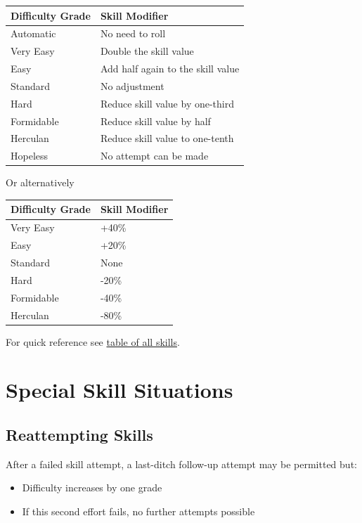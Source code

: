 \documentclass[10pt]{article}
\begin{document}
\begin{longtable}{|l|l|}
\hline
\textbf{Difficulty Grade} & \textbf{Skill Modifier} \\
\hline
Automatic & No need to roll \\
Very Easy & Double the skill value \\
Easy & Add half again to the skill value \\
Standard & No adjustment \\
Hard & Reduce skill value by one-third \\
Formidable & Reduce skill value by half \\
Herculan & Reduce skill value to one-tenth \\
Hopeless & No attempt can be made \\
\hline
\end{longtable}

Or alternatively 

\begin{longtable}{|l|l|}
\hline
\textbf{Difficulty Grade} & \textbf{Skill Modifier} \\
\hline
Very Easy & +40\% \\
Easy & +20\% \\
Standard & None \\
Hard & -20\% \\
Formidable & -40\% \\
Herculan & -80\% \\
\hline
\end{longtable}

For quick reference see \hyperref[sec:skill_table]{table of all skills}.

\section{Special Skill Situations}

\subsection{Reattempting Skills}
\label{sec:reattempt}

After a failed skill attempt, a last-ditch follow-up attempt may be permitted but:
\begin{itemize}
    \item Difficulty increases by one grade
    \item If this second effort fails, no further attempts possible
\end{itemize}
\end{document}
